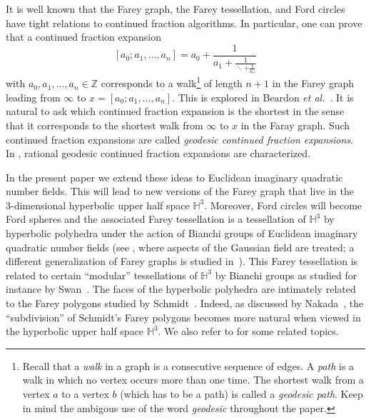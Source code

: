 \documentclass[graybox]{svmult}
\begin{document}
It is well known that the Farey graph, the Farey tessellation, and Ford circles have tight relations to continued fraction algorithms. In particular, one can prove that a continued fraction expansion
\begin{equation}\label{eq:cf}
[a_0;a_1,\ldots,a_n]=
\displaystyle a_0+ \frac1{a_1+ 
 \displaystyle \frac1{\ddots + 
 \displaystyle \frac1{a_n}}}
\end{equation}
with $a_0,a_1,\ldots, a_n \in \mathbb {Z}$ corresponds to a walk\footnote{Recall that a {\em walk} in a graph is a consecutive sequence of edges. A {\em path} is a walk in which no vertex occurs more than one time. The shortest walk from a vertex $a$ to a vertex $b$ (which has to be a path) is called a {\em geodesic path}. Keep in mind  the ambigous use of the word {\em geodesic} throughout the paper.}
of length $n+1$ in the Farey graph leading from $\infty$ to $x=[a_0;a_1,\ldots, a_n]$. This is explored in  Beardon {\em et al.}~\cite{B-H-S}. It is natural to ask which continued fraction expansion is the shortest in the sense that it corresponds to the shortest walk from $\infty$ to $x$ in the Faray graph. Such continued fraction expansions are called {\em geodesic continued fraction expansions}. In \cite{B-H-S}, rational geodesic continued fraction expansions are characterized.

In the present paper we extend these ideas to Euclidean imaginary quadratic number fields. This will lead to new versions of the Farey graph that live in the 3-dimensional hyperbolic upper half space $\mathbb{H}^3$. Moreover, Ford circles will become Ford spheres and the associated Farey tessellation is a tessellation of $\mathbb{H}^3$ by hyperbolic polyhedra under the action of Bianchi groups of Euclidean imaginary quadratic number fields (see \cite{H-1,H-2}, where aspects of the Gaussian field are treated; a different generalization of Farey graphs is studied in~\cite{FKST}). This Farey tessellation is related to certain ``modular'' tessellations of $\mathbb{H}^3$ by Bianchi groups as studied for instance by Swan~\cite{Swan:71}. The faces of the hyperbolic polyhedra are intimately related to the Farey polygons studied by Schmidt~\cite{SchmidtAsmus:69,SchmidtAsmus:78}. Indeed, as discussed by Nakada~\cite{N-Monatshefte,N}, the ``subdivision'' of Schmidt's Farey polygons becomes more natural when viewed in the hyperbolic upper half space $\mathbb{H}^3$.  
We also refer to \cite{C, hatcher1983hyperbolic, Marklof:10, S-vS-Z, Stange:18, Stange2014} for some related topics. 
\end{document}
